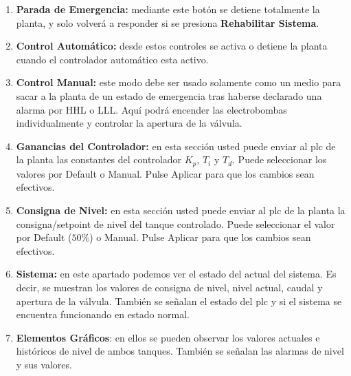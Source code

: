 \begin{enumerate}
\item \textbf{Parada de Emergencia:} mediante este botón se detiene totalmente
la planta, y solo volverá a responder si se presiona \textbf{Rehabilitar
Sistema}.
 \item \textbf{Control Automático:} desde estos controles se activa o detiene
la planta cuando el controlador automático esta activo.
 \item \textbf{Control Manual:} este modo debe ser usado solamente como un
medio para
sacar a la planta de un estado de emergencia tras  haberse declarado una alarma
por HHL o LLL.
Aquí podrá encender las electrobombas individualmente y controlar la apertura
de la válvula.
 \item \textbf{Ganancias del Controlador:} en esta sección usted puede enviar al
\gls{plc} de la planta las constantes del controlador $K_p$, $T_i$ y $T_d$. 
Puede seleccionar los valores por Default o Manual. Pulse Aplicar para que los
cambios sean efectivos.
 \item \textbf{Consigna de Nivel:} en esta sección usted puede enviar al
\gls{plc} de la planta la consigna/setpoint de nivel del tanque controlado. 
Puede seleccionar el valor por Default ($50\%$) o Manual. Pulse Aplicar para
que
los cambios sean efectivos.
 \item \textbf{Sistema:} en este apartado podemos ver el estado del actual del
sistema. Es decir, se muestran los valores de consigna de nivel, nivel
actual, caudal y apertura de la válvula. También se señalan el estado del 
\gls{plc} y si el sistema se encuentra funcionando en estado normal.
\item \textbf{Elementos Gráficos}: en ellos se pueden observar los valores
actuales e
históricos de nivel de ambos tanques. También se señalan las alarmas de nivel y
sus valores.
\end{enumerate}
